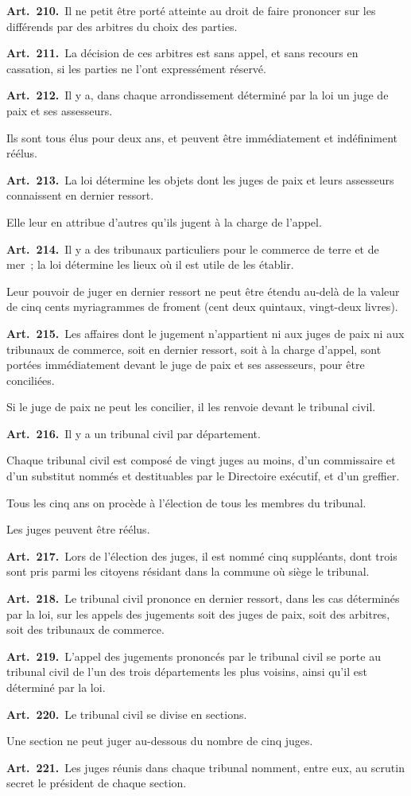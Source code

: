 \documentclass[french,twoside]{book} %
\newcommand{\labelchar}[1]{\textbf{\color{rubric} #1}}
\begin{document}
\labelchar{Art. 210.} Il ne petit être porté atteinte au droit de faire prononcer sur les différends par des arbitres du choix des parties.\par
\labelchar{Art. 211.} La décision de ces arbitres est sans appel, et sans recours en cassation, si les parties ne l’ont expressément réservé.\par
\labelchar{Art. 212.} Il y a, dans chaque arrondissement déterminé par la loi un juge de paix et ses assesseurs.\par
Ils sont tous élus pour deux ans, et peuvent être immédiatement et indéfiniment réélus.\par
\labelchar{Art. 213.} La loi détermine les objets dont les juges de paix et leurs assesseurs connaissent en dernier ressort.\par
Elle leur en attribue d’autres qu’ils jugent à la charge de l’appel.\par
\labelchar{Art. 214.} Il y a des tribunaux particuliers pour le commerce de terre et de mer ; la loi détermine les lieux où il est utile de les établir.\par
Leur pouvoir de juger en dernier ressort ne peut être étendu au-delà de la valeur de cinq cents myriagrammes de froment (cent deux quintaux, vingt-deux livres).\par
\labelchar{Art. 215.} Les affaires dont le jugement n’appartient ni aux juges de paix ni aux tribunaux de commerce, soit en dernier ressort, soit à la charge d’appel, sont portées immédiatement devant le juge de paix et ses assesseurs, pour être conciliées.\par
Si le juge de paix ne peut les concilier, il les renvoie devant le tribunal civil.\par
\labelchar{Art. 216.} Il y a un tribunal civil par département.\par
Chaque tribunal civil est composé de vingt juges au moins, d’un commissaire et d’un substitut nommés et destituables par le Directoire exécutif, et d’un greffier.\par
Tous les cinq ans on procède à l’élection de tous les membres du tribunal.\par
Les juges peuvent être réélus.\par
\labelchar{Art. 217.} Lors de l’élection des juges, il est nommé cinq suppléants, dont trois sont pris parmi les citoyens résidant dans la commune où siège le tribunal.\par
\labelchar{Art. 218.} Le tribunal civil prononce en dernier ressort, dans les cas déterminés par la loi, sur les appels des jugements soit des juges de paix, soit des arbitres, soit des tribunaux de commerce.\par
\labelchar{Art. 219.} L’appel des jugements prononcés par le tribunal civil se porte au tribunal civil de l’un des trois départements les plus voisins, ainsi qu’il est déterminé par la loi.\par
\labelchar{Art. 220.} Le tribunal civil se divise en sections.\par
Une section ne peut juger au-dessous du nombre de cinq juges.\par
\labelchar{Art. 221.} Les juges réunis dans chaque tribunal nomment, entre eux, au scrutin secret le président de chaque section.
\end{document}
